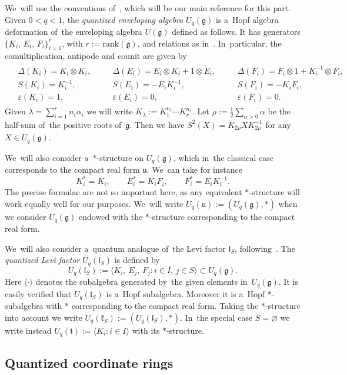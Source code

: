\documentclass[10pt,a4paper]{amsart}
\numberwithin{equation}{section}
\newcommand{\lieg}{\mathfrak{g}}
\newcommand{\liel}{\mathfrak{l}}
\newcommand{\lieu}{\mathfrak{u}}
\newcommand{\Uqg}{U_q(\mathfrak{g})}
\newcommand{\Uqt}{U_q(\mathfrak{t})}
\newcommand{\Uqu}{U_q(\mathfrak{u})}
\newcommand{\UqkS}{U_q(\mathfrak{k}_S)}
\newcommand{\UqlS}{U_q(\mathfrak{l}_S)}
\begin{document}
We~will use the conventions of~\cite{klsc}, which will be our main reference for this part.
Given $0 < q < 1$, the \emph{quantized enveloping algebra} $\Uqg$ is a~Hopf algebra deformation of~the enveloping algebra $U(\lieg)$ defined as follows.
It has generators $\{ K_i,\,E_i,\, F_i \}_{i = 1}^r$, with $r := \mathrm{rank}(\lieg)$, and relations as in~\cite[Section~6.1.2]{klsc}.
In~particular, the comultiplication, antipode and counit are given by
\begin{gather*}
\begin{aligned}
&\Delta(K_i) = K_i \otimes K_i,\quad
&&\Delta(E_i) = E_i \otimes K_i + 1 \otimes E_i,\quad
&&\Delta(F_i) = F_i \otimes 1 + K_i^{-1} \otimes F_i,
\\
&S(K_i) = K_i^{-1},
&&S(E_i) = - E_i K_i^{-1},
&&S(F_i) = - K_i F_i,
\\
&\varepsilon(K_i) = 1,
&&\varepsilon(E_i) = 0,
&&\varepsilon(F_i) = 0.
\end{aligned}
\end{gather*}
Given $\lambda = \sum_{i = 1}^r n_i \alpha_i$ we will write $K_\lambda := K_1^{n_1} \cdots K_r^{n_r}$.
Let $\rho := \frac{1}{2} \sum_{\alpha > 0} \alpha$ be the half-sum of~the positive roots of~$\lieg$.
Then we have $S^2(X) = K_{2 \rho} X K_{2 \rho}^{-1}$ for any $X \in \Uqg$.

We~will also consider a~$*$-structure on $\Uqg$, which in~the classical case corresponds to the compact real form $\lieu$.
We~can take for instance
\[
K_i^* = K_i, \qquad
E_i^* = K_i F_i, \qquad
F_i^* = E_i K_i^{-1}.
\]
The precise formulae are not so important here, as any equivalent $*$-structure will work equally well for our purposes.
We~will write $\Uqu := (\Uqg, *)$ when we consider $\Uqg$ endowed with the $*$-structure corresponding to the compact real form.

We~will also consider a~quantum analogue of~the Levi factor $\liel_S$, following~\cite{quantum-flag}.
The \emph{quantized Levi factor} $\UqlS$ is defined by
\[
\UqlS := \langle K_i, \, E_j, \, F_j \colon i \in I, \, j \in S \rangle \subset \Uqg.
\]
Here $\langle \cdot \rangle$ denotes the subalgebra generated by~the given elements in~$\Uqg$.
It is easily verified that $\UqlS$ is a~Hopf subalgebra.
Moreover it is a~Hopf $*$-subalgebra with $*$ corresponding to the compact real form.
Taking the $*$-structure into account we write $\UqkS := (\UqlS, *)$.
In~the special case $S = \varnothing$ we write instead $\Uqt := \langle K_i\colon i \in I \rangle$ with its $*$-structure.

\subsection{Quantized coordinate rings}
\end{document}
